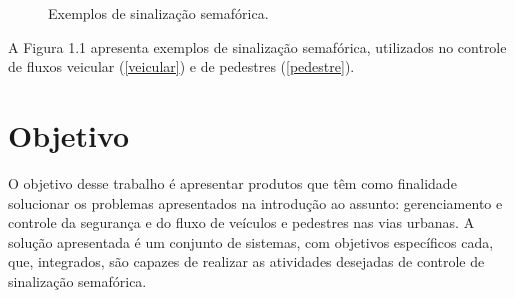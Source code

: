 \begin{figure}[ht]
    \begin{center}
    \caption[Semáforos]{Exemplos de sinalização semafórica.}
    \end{center}
    \label{semaforos}
\end{figure}

A Figura 1.1 apresenta exemplos de sinalização semafórica, utilizados no controle de fluxos veicular (\ref{veicular}) e de pedestres (\ref{pedestre}).

\section{Objetivo}

O objetivo desse trabalho é apresentar produtos que têm como finalidade solucionar os problemas apresentados na introdução ao assunto: gerenciamento e controle da segurança e do fluxo de veículos e pedestres nas vias urbanas. A solução apresentada é um conjunto de sistemas, com objetivos específicos cada, que, integrados, são capazes de realizar as atividades desejadas de controle de sinalização semafórica.

